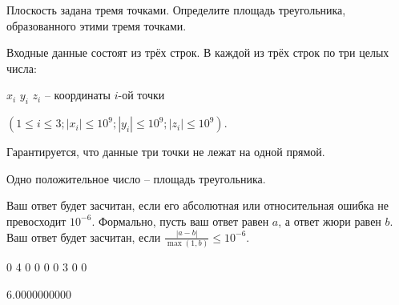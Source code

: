 
Плоскость задана тремя точками. Определите площадь треугольника, образованного этими тремя точками.


Входные данные состоят из трёх строк. В каждой из трёх строк по три целых числа:

$x_i$ $y_i$ $z_i$ -- координаты $i$-ой точки

$(1 \le i \le 3; |x_{i}| \le 10^{9}; |y_{i}| \le 10^{9}; |z_{i}| \le 10^{9})$.

Гарантируется, что данные три точки не лежат на одной прямой.

\outputfmtSection

Одно положительное число -- площадь треугольника.

Ваш ответ будет засчитан, если его абсолютная или относительная ошибка не превосходит $10^{-6}$. Формально, пусть ваш ответ равен $a$, а ответ жюри равен $b$. Ваш ответ будет засчитан, если $\frac {|a - b|}{\max(1, b)} \le 10^{-6}$.

\exampleSection


\begin{myverbbox}[\small]{\vinput}
0 4 0
0 0 0
3 0 0
\end{myverbbox}
\begin{myverbbox}[\small]{\voutput}
6.0000000000
\end{myverbbox}

